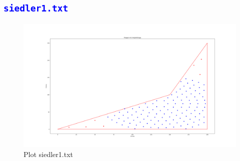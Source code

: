 \documentclass{article}
\begin{document}
\subsection{\textcolor{blue}{\texttt{siedler1.txt}}}
\begin{figure}[H]
    \centering
    \includegraphics[width=1\textwidth]{Bilder/Figure_1.png}
    \caption{Plot siedler1.txt}
\end{figure}
\vspace{5pt}
\end{document}

